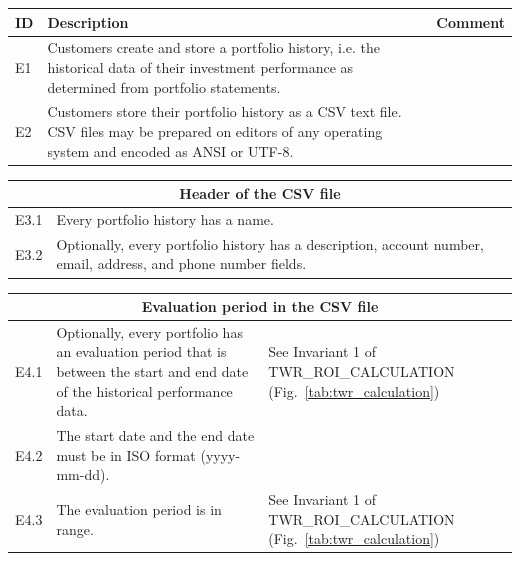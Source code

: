 \documentclass[runningheads,12pt]{article}
\begin{document}
{\centering
\begin{longtable}{|l|p{9cm}|p{5cm}|}
\hline
\textbf{ID} & \textbf{Description} & \textbf{Comment}\\

\hline
E1 & Customers create and store a portfolio history, i.e. the historical data of their investment performance as determined from portfolio statements. & \\

\hline
E2 & Customers store their portfolio history as a CSV text file. CSV files may be prepared on editors of any operating system and encoded as ANSI or UTF-8. & \\

\hline
\end{longtable}


\centering
\begin{longtable}{|l|p{9cm}|p{5cm}|}

\hline
\multicolumn{3}{|c|}{\textbf{Header of the CSV file}} \\


\hline
E3.1 & Every portfolio history has a name. & \\

\hline
E3.2 & Optionally, every portfolio history has a description, account number, email, address, and phone number fields. & \\

\hline
\end{longtable}

\centering
\begin{longtable}{|l|p{9cm}|p{5cm}|}

\hline
\multicolumn{3}{|c|}{\textbf{Evaluation period in the CSV file}} \\

\hline
E4.1 & Optionally, every portfolio has an evaluation period that is between the start and end date of the historical performance data. & See Invariant 1 of TWR\_ROI\_CALCULATION (Fig.~\ref{tab:twr_calculation})\\

\hline
E4.2 & The start date and the end date must be in ISO format (yyyy-mm-dd). & \\

\hline
E4.3 & The evaluation period is in range. & See Invariant 1 of TWR\_ROI\_CALCULATION (Fig.~\ref{tab:twr_calculation})\\

\hline
\end{longtable}

}
\end{document}
